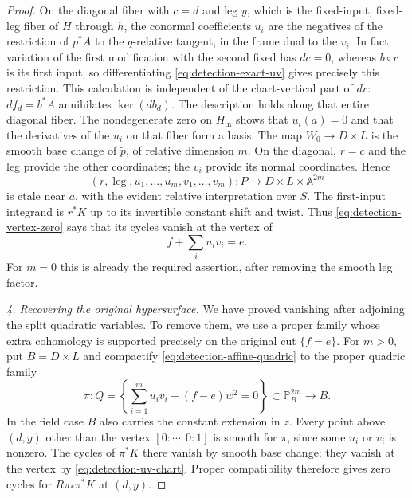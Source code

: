 \begin{proof}
On the diagonal fiber with $c=d$ and leg $y$, which is the fixed-input,
fixed-leg fiber of $H$ through $h$, the conormal coefficients
$u_i$ are the negatives of the restriction of $p^*A$ to the
$q$-relative tangent, in the frame dual to the $v_i$.  In fact variation
of the first modification with the second fixed has $dc=0$, whereas
$b\circ r$ is its first input, so differentiating
\eqref{eq:detection-exact-uv} gives precisely this restriction.  This
calculation is independent of the chart-vertical part of $dr$:
$df_d=b^*A$ annihilates $\ker(db_d)$.
The description holds along that entire diagonal fiber.  The
nondegenerate zero on $H_{\mathrm{in}}$ shows that $u_i(a)=0$ and that the
derivatives of the $u_i$ on that fiber form a basis.  The map
$W_0\to D\times L$ is the smooth base change of $\widetilde p$,
of relative dimension $m$.  On the diagonal,
$r=c$ and the leg provide the other coordinates; the $v_i$ provide its
normal coordinates.  Hence
\begin{equation}\label{eq:detection-uv-chart}
 (r,\operatorname{leg},u_1,\ldots,u_m,v_1,\ldots,v_m):
 P\longrightarrow D\times L\times\mathbb A^{2m}
\end{equation}
is etale near $a$, with the evident relative interpretation over $S$.
The first-input integrand is $r^*K$ up to its invertible constant shift
and twist.  Thus \eqref{eq:detection-vertex-zero} says that its cycles
vanish at the vertex of
\begin{equation}\label{eq:detection-affine-quadric}
                         f+\sum_i u_i v_i=e.
\end{equation}
For $m=0$ this is already the required assertion, after removing the
smooth leg factor.

\smallskip\noindent
\emph{4. Recovering the original hypersurface.}
We have proved vanishing after adjoining the split quadratic variables.
To remove them, we use a proper family whose extra cohomology is
supported precisely on the original cut $\{f=e\}$.
For $m>0$, put $B=D\times L$ and compactify
\eqref{eq:detection-affine-quadric} to the proper quadric family
\begin{equation}\label{eq:detection-projective-quadric}
 \pi:Q=\left\{\sum_{i=1}^m u_i v_i+(f-e)w^2=0\right\}
               \subset\mathbb P^{2m}_B\longrightarrow B.
\end{equation}
In the field case $B$ also carries the constant extension in $z$.
Every point above $(d,y)$ other than the vertex $[0:\cdots:0:1]$ is
smooth for $\pi$, since some $u_i$ or $v_i$ is nonzero.  The cycles of
$\pi^*K$ there vanish by smooth base change; they vanish at the vertex
by \eqref{eq:detection-uv-chart}.  Proper compatibility therefore gives
zero cycles for $R\pi_*\pi^*K$ at $(d,y)$.


\end{proof}
